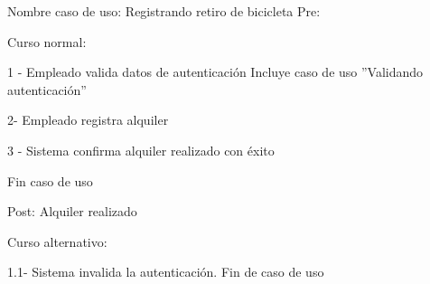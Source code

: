 Nombre caso de uso: Registrando retiro de bicicleta
Pre: 

Curso normal: 

1 - Empleado valida datos de autenticación
	  Incluye caso de uso ''Validando autenticación''

2- Empleado registra alquiler

3 - Sistema confirma alquiler realizado con éxito

Fin caso de uso

Post: Alquiler realizado

Curso alternativo:

1.1- Sistema invalida la autenticación. Fin de caso de uso